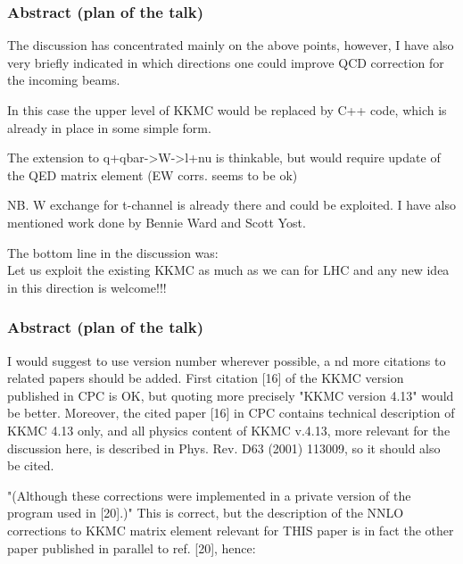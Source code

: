 \documentclass{beamer}
\begin{document}
\begin{frame}[fragile]
\frametitle{Abstract (plan of the talk)}

\small
The discussion has concentrated mainly on the above points, however,
I have also very briefly indicated in which directions one could improve
QCD correction for the incoming beams.

In this case the upper level of KKMC would be replaced by C++ code,
which is already in place in some simple form.

The extension to q+qbar->W->l+nu is thinkable, but would require
update of the QED matrix element (EW corrs. seems to be ok)

NB. W exchange for t-channel is already there and could be exploited.
I have also mentioned work done by Bennie Ward and Scott Yost.

The bottom line in the discussion was:\\
Let us exploit the existing KKMC as much as we can for LHC
and any new idea in this direction is welcome!!!
\end{frame}


\begin{frame}[fragile]
\frametitle{Abstract (plan of the talk)}
\small
I would suggest to use version number wherever possible, a
nd more citations to related papers should be added.
First citation [16] of the KKMC version published in CPC is OK,
but quoting more precisely "KKMC version 4.13" would be better.
Moreover, the cited paper [16] in CPC contains technical description of KKMC 4.13 only,
and all physics content of KKMC v.4.13, more relevant for the discussion here,
is described in Phys. Rev. D63 (2001) 113009, so it should also be cited.

"(Although these corrections were implemented in a private version
of the program used in [20].)"
This is correct, but the description of the NNLO corrections to KKMC matrix element
relevant for THIS paper is in fact the other paper published
in parallel to ref. [20], hence:
\end{frame}
\end{document}
